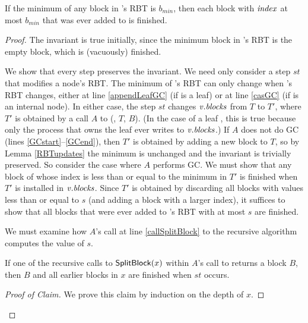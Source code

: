 \begin{invariant}\label{inv::finished}
If the minimum  of any block in 's RBT is $b_{min}$, then
each block with $\mbox{\textit{index}}$ at most $b_{min}$ that was ever added to  is finished.
\end{invariant}
\begin{proof}
The invariant is true initially, since the minimum  block in 's RBT is the empty block, which is (vacuously) finished.

We show that every step preserves the invariant.  
We need only consider a step $st$ that modifies a node's RBT.
The minimum  of 's RBT can only change when 's RBT changes, either at line 
\ref{appendLeafGC} (if  is a leaf) or at line \ref{casGC} (if  is an internal node).
In either case, the step $st$ changes $\mbox{\textnormal{\textit{v}}}.\mbox{\textit{blocks}}$ 
from $T$ to $T'$, where $T'$ is obtained by  a call $A$ to (, $T$, $B$).
(In the case of a leaf , this is true because only the process that owns the leaf ever
writes to $\mbox{\textnormal{\textit{v}}}.\mbox{\textit{blocks}}$.)
If $A$ does not do GC (lines \ref{GCstart}--\ref{GCend}), 
then $T'$ is obtained by adding a new block to $T$, so by Lemma \ref{RBTupdates} the minimum 
is unchanged and the invariant is trivially preserved.
So consider the case where $A$ performs GC.
We must show that any block of  whose index is less than or equal to the
minimum  in $T'$ is finished when $T'$ is installed in $\mbox{\textnormal{\textit{v}}}.\mbox{\textit{blocks}}$.
Since $T'$ is obtained by discarding all blocks with  values less than or equal to $s$ (and adding
a block with a larger index), it suffices to show that all blocks that were ever added
to 's RBT with  at most $s$ are finished.

We must examine how $A$'s call at line \ref{callSplitBlock} to the recursive algorithm  computes the value of $s$.

\begin{claim}\label{splitfinished}
If one of the recursive calls to ${\sf SplitBlock}(x)$ within $A$'s call to  returns a block $B$,
then $B$ and all earlier blocks in $x$ are finished when $st$ occurs.
\end{claim}
\begin{proof}[Proof of Claim]
We prove this claim  by induction on the depth of $x$.


\end{proof}
\end{proof}
